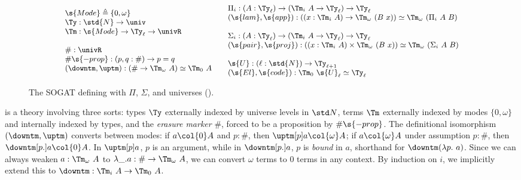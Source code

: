 \documentclass[a4paper,UKenglish,cleveref,autoref,thm-restate]{lipics-v2021}
\begin{document}
\begin{figure}[h]
\centering
\[\small\begin{array}{l}
  \s{Mode} \triangleq \{0, \omega\} \\
  \Ty : \std{N} \to \univ \\
  \Tm : \s{Mode} \to \Ty_\ell \to \univR \\
  \\
  \# : \univR \\
  \#\s{-prop} : (p, q : \#) \to p = q \\
  (\downtm, \uptm) : (\# \to \Tm_\omega\ A) \simeq \Tm_0\ A
\end{array}
\quad
\begin{array}{l}
  \Pi_i : (A : \Ty_\ell) \to (\Tm_i\ A \to \Ty_\ell) \to \Ty_\ell \\
  (\s{lam}, \s{app}) : ((x : \Tm_i\ A) \to \Tm_\omega\ (B\ x)) \simeq \Tm_\omega\ (\Pi_i\ A\ B) \\
  \\
  \Sigma_i : (A : \Ty_\ell) \to (\Tm_i\ A \to \Ty_\ell) \to \Ty_\ell \\
  (\s{pair}, \s{proj}) : ((x : \Tm_i\ A) \times \Tm_\omega\ (B\ x)) \simeq \Tm_\omega\ (\Sigma_i\ A\ B) \\
  \\
  \s{U} : (\ell : \std{N}) \to \Ty_{\ell + 1} \\
  (\s{El}, \s{code}) : \Tm_0\ \s{U}_\ell \simeq \Ty_\ell
\end{array}\]
\caption{The SOGAT defining \ZTT with $\Pi$, $\Sigma$, and universes ().}
\label{fig:tt0-sogat}
\end{figure}

\ZTT is a theory involving three sorts: types $\Ty$ externally indexed by
universe levels in $\std N$, terms $\Tm$ externally indexed by modes $\{0, \omega\}$ and
internally indexed by types, and the \emph{erasure marker} $\#$, forced to be a
proposition by $\#\s{-prop}$. The definitional isomorphism $(\downtm, \uptm)$
converts between modes: if $a \col{0} A$ and $p : \#$, then $\uptm[p] a
\col{\omega} A$; if $a \col{\omega} A$ under assumption $p: \#$, then
$\downtm[p.] a \col{0} A$. In $\uptm[p] a$, $p$ is an argument, while in
$\downtm[p.] a$, $p$ is \emph{bound} in $a$, shorthand for $\downtm (\lambda p.\
a)$. Since we can always weaken $a : \Tm_\omega\ A$ to $\lambda\_.a : \# \to
\Tm_\omega\ A$, we can convert $\omega$ terms to 0 terms in any context. By
induction on $i$, we implicitly extend this to $\downtm : \Tm_i\ A \to \Tm_0\
A$.
\end{document}
